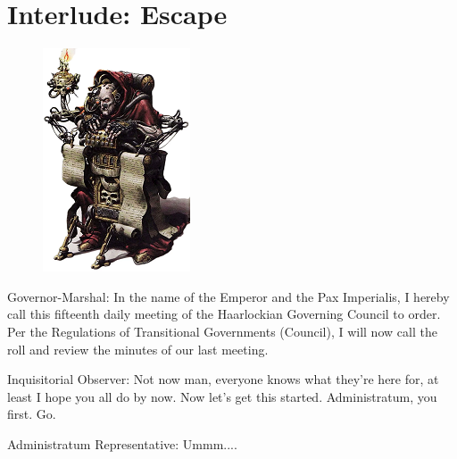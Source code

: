 \chapter{Interlude: Escape}

\begin{figure}
	\begin{center}
		\includegraphics[width=\figwidth]{pics/20/1.png}
	\end{center}
\end{figure}












Governor-Marshal: 
In the name of the Emperor and the Pax Imperialis, I hereby call this fifteenth daily meeting of the Haarlockian Governing Council to order. 
Per the Regulations of Transitional Governments (Council), I will now call the roll and review the minutes of our last meeting.

Inquisitorial Observer: 
Not now man, everyone knows what they're here for, at least I hope you all do by now. 
Now let's get this started. 
Administratum, you first. 
Go. 


Administratum Representative: 
Ummm....

